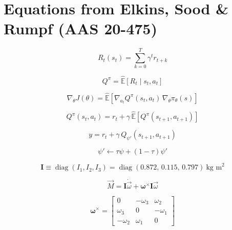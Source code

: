 \documentclass{article}
\begin{document}
\section*{Equations from Elkins, Sood \& Rumpf (AAS 20-475)}

\begin{equation}
R_t(s_t) = \sum_{k=0}^{T} \gamma^{t} r_{t+k}
\end{equation}

\begin{equation}
Q^{\pi} = \hat{\mathbb{E}}\left[ R_t \mid s_t, a_t \right]
\end{equation}

\begin{equation}
\nabla_{\theta} J(\theta) = \hat{\mathbb{E}}\left[ \nabla_{a_t} Q^{\pi}(s_t, a_t)\, \nabla_{\theta} \pi_{\theta}(s) \right]
\end{equation}

\begin{equation}
Q^{\pi}(s_t, a_t) = r_t + \gamma\, \hat{\mathbb{E}}\left[ Q^{\pi}(s_{t+1}, a_{t+1}) \right]
\end{equation}

\begin{equation}
y = r_t + \gamma\, Q_{\psi'}(s_{t+1}, a_{t+1})
\end{equation}

\begin{equation}
\psi' \longleftarrow \tau \psi + (1 - \tau)\psi'
\end{equation}

\begin{equation}
\mathbf{I} \equiv \operatorname{diag}(I_1, I_2, I_3) = \operatorname{diag}(0.872,\, 0.115,\, 0.797)\ \text{kg m}^2
\end{equation}

\begin{equation}
\vec{M} = \mathbf{I}\dot{\vec{\omega}} + \boldsymbol{\omega}^{\times}\mathbf{I}\vec{\omega}
\end{equation}

\begin{equation}
\boldsymbol{\omega}^{\times} =
\begin{bmatrix}
0 & -\omega_3 & \omega_2 \\
\omega_3 & 0 & -\omega_1 \\
-\omega_2 & \omega_1 & 0
\end{bmatrix}
\end{equation}
\end{document}
